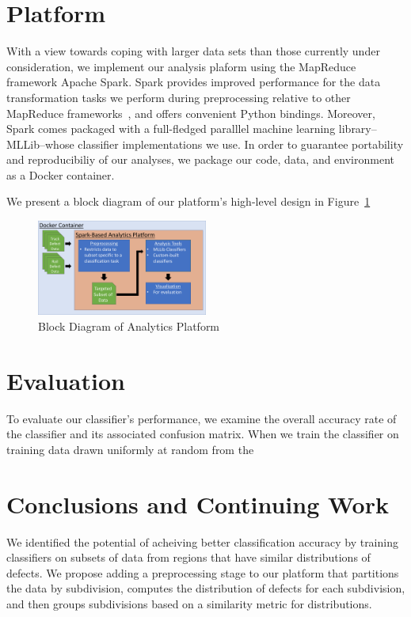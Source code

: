 \documentclass{sig-alternate-05-2015}
\begin{document}
\section{Platform}
With a view towards coping with larger data sets than those currently under consideration, we
implement our analysis plaform using the MapReduce framework Apache Spark. Spark provides 
improved performance for the data transformation tasks we perform during preprocessing relative
to other MapReduce frameworks~\cite{Zaharia:2012}, and offers convenient Python bindings. Moreover, Spark comes 
packaged with a full-fledged paralllel machine learning library--MLLib--whose classifier 
implementations we use.
In order to guarantee portability and reproducibiliy of our analyses, we package our code,
data, and environment as a Docker container. 

We present a block diagram of our platform's high-level design in Figure~\ref{fig_block_diagram}
\begin{figure}[ht!]
\includegraphics[width=0.50\textwidth]{block_diagram.pdf}
\caption{Block Diagram of Analytics Platform}
\label{fig_block_diagram}
\end{figure}

\section{Evaluation}
To evaluate our classifier's performance, we examine the overall accuracy rate of the classifier
and its associated confusion matrix. When we train the classifier on training data drawn 
uniformly at random from the 

\section{Conclusions and Continuing Work}
We identified the potential of acheiving better classification accuracy by training 
classifiers on subsets of data from regions that have similar distributions of defects.
We propose adding a preprocessing stage to our platform that partitions the data by 
subdivision, computes the distribution of defects for each subdivision, and then groups
subdivisions based on a similarity metric for distributions. 
\end{document}
